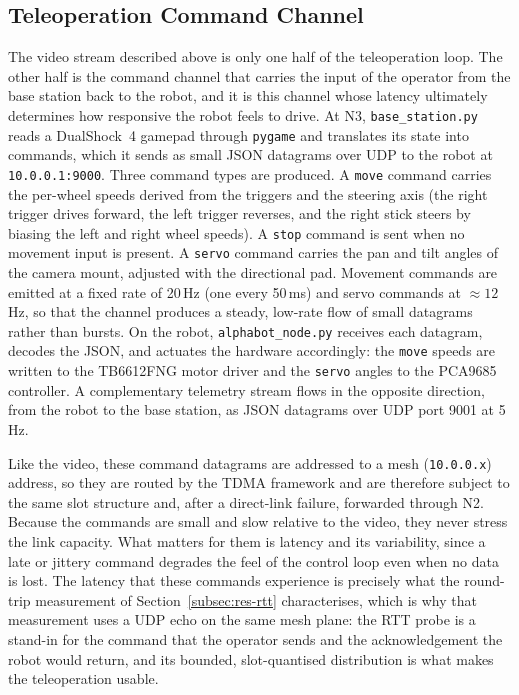 \subsection{Teleoperation Command Channel}
\label{subsec:cmd-channel}

The video stream described above is only one half of the teleoperation loop. The
other half is the command channel that carries the input of the operator from the
base station back to the robot, and it is this channel whose latency ultimately
determines how responsive the robot feels to drive. At N3, \texttt{base\_station.py}
reads a DualShock~4 gamepad through \texttt{pygame} and translates its state into
commands, which it sends as small JSON datagrams over UDP to the robot at
\texttt{10.0.0.1:9000}. Three command types are produced. A \texttt{move}
command carries the per-wheel speeds derived from the triggers and the steering
axis (the right trigger drives forward, the left trigger reverses, and the right
stick steers by biasing the left and right wheel speeds). A \texttt{stop}
command is sent when no movement input is present. A \texttt{servo} command
carries the pan and tilt angles of the camera mount, adjusted with the
directional pad. Movement commands are emitted at a fixed rate of 20\,Hz (one
every 50\,ms) and servo commands at $\approx 12$\,Hz, so that the channel
produces a steady, low-rate flow of small datagrams rather than bursts. On the
robot, \texttt{alphabot\_node.py} receives each datagram, decodes the JSON, and
actuates the hardware accordingly: the \texttt{move} speeds are written to the
TB6612FNG motor driver and the \texttt{servo} angles to the PCA9685 controller.
A complementary telemetry stream flows in the opposite direction, from the robot
to the base station, as JSON datagrams over UDP port 9001 at 5\,Hz.

Like the video, these command datagrams are addressed to a mesh (\texttt{10.0.0.x})
address, so they are routed by the TDMA framework and are therefore subject to
the same slot structure and, after a direct-link failure, forwarded through N2.
Because the commands are small and slow relative to the video, they never stress
the link capacity. What matters for them is latency and its variability, since a
late or jittery command degrades the feel of the control loop even when no data
is lost. The latency that these commands experience is precisely what the
round-trip measurement of Section~\ref{subsec:res-rtt} characterises, which is
why that measurement uses a UDP echo on the same mesh plane: the RTT probe is a
stand-in for the command that the operator sends and the acknowledgement the
robot would return, and its bounded, slot-quantised distribution is what makes
the teleoperation usable.

